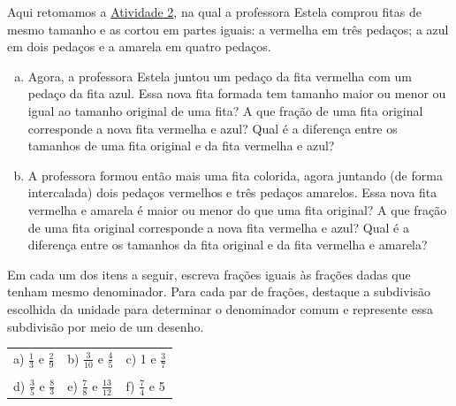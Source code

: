 \begin{atividade}{}

Aqui retomamos a \hyperref[chap5-ativ2]{Atividade 2}, na qual a professora Estela comprou fitas de mesmo tamanho e as cortou em partes iguais: a vermelha em três pedaços; a azul em dois pedaços e a amarela em quatro pedaços.

\begin{center}
\end{center}

\begin{enumerate}[a)]
  \item  Agora, a professora Estela juntou um pedaço da fita vermelha com um pedaço da fita azul. Essa nova fita formada tem tamanho maior ou menor ou igual ao tamanho original de uma fita? A que fração de uma fita original corresponde a nova fita vermelha e azul? Qual é a diferença entre os tamanhos de uma fita original e da fita vermelha e azul?
  \item  A professora formou então mais uma fita colorida, agora juntando (de forma intercalada) dois pedaços vermelhos e três pedaços amarelos. Essa nova fita vermelha e amarela é maior ou menor do que uma fita original? A que fração de uma fita original corresponde a nova fita vermelha e azul? Qual é a diferença entre os tamanhos da fita original e da fita vermelha e amarela?
\end{enumerate}

\end{atividade}

\begin{atividade}{}


Em cada um dos itens a seguir, escreva frações iguais às frações dadas que tenham mesmo denominador. Para cada par de frações, destaque a subdivisão escolhida da unidade para determinar o denominador comum e represente essa subdivisão por meio de um desenho.

\begin{center}
  \begin{tabular}{m{}m{}m{}}

     a) $\frac{1}{3}$ e $\frac{2}{9}$  &   b) $\frac{3}{10}$ e $\frac{4}{5}$  &   c) 1 e $\frac{3}{7}$  \\
     \\
     d) $\frac{3}{5}$ e $\frac{8}{3}$  &   e) $\frac{7}{8}$ e $\frac{13}{12}$  &  f) $\frac{7}{4}$ e 5
  \end{tabular}
\end{center}
\end{atividade}

